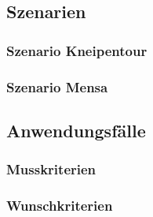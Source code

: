 \subsection{Szenarien}
\subsubsection{Szenario Kneipentour}

\subsubsection{Szenario Mensa}

\subsection{Anwendungsfälle}
\subsubsection{Musskriterien}
\subsubsection{Wunschkriterien}
